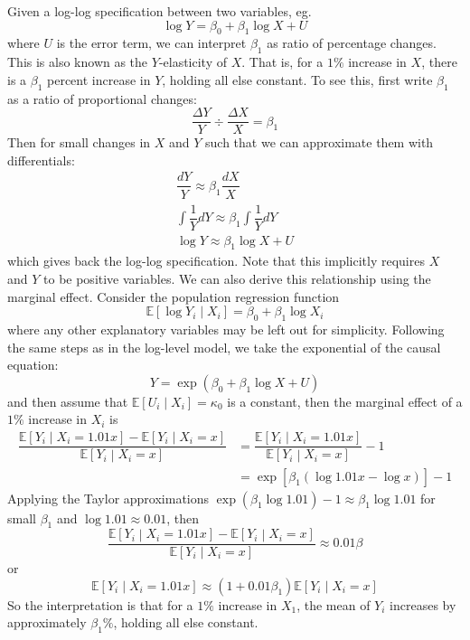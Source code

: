 \documentclass[11pt]{report} %
\begin{document}
Given a log-log specification between two variables, eg.
\begin{equation}
\log Y = \beta_{0} + \beta_{1}\log X + U
\end{equation}
where $U$ is the error term, we can interpret $\beta_{1}$ as ratio of percentage changes. This is also known as the $Y$-elasticity of $X$. That is, for a $1\%$ increase in $X$, there is a $\beta_{1}$ percent increase in $Y$, holding all else constant. To see this, first write $\beta_{1}$ as a ratio of proportional changes:
\begin{equation}
\dfrac{\Delta Y}{Y} \div \dfrac{\Delta X}{X} = \beta_{1} 
\end{equation}
Then for small changes in $X$ and $Y$ such that we can approximate them with differentials:
\begin{gather}
\dfrac{dY}{Y} \approx \beta_{1}\dfrac{dX}{X} \\
\int\dfrac{1}{Y}dY \approx \beta_{1}\int\dfrac{1}{Y}dY \\
\log Y \approx \beta_{1}\log X + U
\end{gather}
which gives back the log-log specification. Note that this implicitly requires $X$ and $Y$ to be positive variables. We can also derive this relationship using the marginal effect. Consider the population regression function
\begin{equation}
\mathbb{E}\left[\log Y_{i}\middle|X_{i}\right] = \beta_{0} + \beta_{1}\log X_{i}
\end{equation}
where any other explanatory variables may be left out for simplicity. Following the same steps as in the log-level model, we take the exponential of the causal equation:
\begin{equation}
Y = \exp\left(\beta_{0} + \beta_{1}\log X + U\right)
\end{equation}
and then assume that $\mathbb{E}\left[U_{i}\middle|X_{i}\right] = \kappa_{0}$ is a constant, then the marginal effect of a $1\%$ increase in $X_{i}$ is
\begin{align}
\dfrac{\mathbb{E}\left[Y_{i}\middle|X_{i} = 1.01x \right] - \mathbb{E}\left[Y_{i}\middle|X_{i} = x \right]}{\mathbb{E}\left[Y_{i}\middle|X_{i} = x \right]} &= \dfrac{\mathbb{E}\left[Y_{i}\middle|X_{i}=1.01x\right]}{\mathbb{E}\left[Y_{i}\middle|X_{i}=x\right]}-1 \\
&= \exp\left[\beta_{1}\left(\log1.01x-\log x\right)\right] - 1
\end{align}
Applying the Taylor approximations $\exp\left(\beta_{1}\log 1.01\right) - 1 \approx \beta_{1}\log 1.01$ for small $\beta_{1}$ and $\log 1.01 \approx 0.01$, then
\begin{equation}
\dfrac{\mathbb{E}\left[Y_{i}\middle|X_{i}=1.01x\right]-\mathbb{E}\left[Y_{i}\middle|X_{i}=x\right]}{\mathbb{E}\left[Y_{i}\middle|X_{i}=x\right]} \approx 0.01\beta
\end{equation}
or
\begin{equation}
\mathbb{E}\left[Y_{i}\middle|X_{i}=1.01x\right] \approx \left(1 + 0.01\beta_{1}\right)\mathbb{E}\left[Y_{i}\middle|X_{i}=x\right]
\end{equation}
So the interpretation is that for a $1\%$ increase in $X_{1}$, the mean of $Y_{i}$ increases by approximately $\beta_{1}\%$, holding all else constant.
\end{document}
